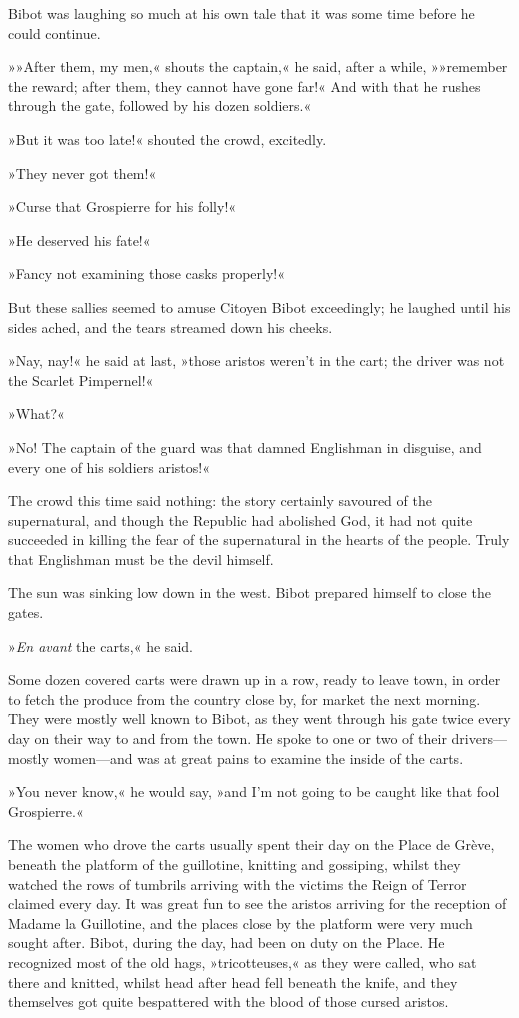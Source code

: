 Bibot was laughing so much at his own tale that it was some time before he could continue.

»»After them, my men,« shouts the captain,« he said, after a while, »»remember the reward; after them, they cannot have gone far!« And with that he rushes through the gate, followed by his dozen soldiers.«

»But it was too late!« shouted the crowd, excitedly.

»They never got them!«

»Curse that Grospierre for his folly!«

»He deserved his fate!«

»Fancy not examining those casks properly!«

But these sallies seemed to amuse Citoyen Bibot exceedingly; he laughed until his sides ached, and the tears streamed down his cheeks.

»Nay, nay!« he said at last, »those aristos weren't in the cart; the driver was not the Scarlet Pimpernel!«

»What?«

»No! The captain of the guard was that damned Englishman in disguise, and every one of his soldiers aristos!«

The crowd this time said nothing: the story certainly savoured of the supernatural, and though the Republic had abolished God, it had not quite succeeded in killing the fear of the supernatural in the hearts of the people. Truly that Englishman must be the devil himself.

The sun was sinking low down in the west. Bibot prepared himself to close the gates.

»\textit{En avant} the carts,« he said.

Some dozen covered carts were drawn up in a row, ready to leave town, in order to fetch the produce from the country close by, for market the next morning. They were mostly well known to Bibot, as they went through his gate twice every day on their way to and from the town. He spoke to one or two of their drivers\allowbreak---\allowbreak mostly women\allowbreak---\allowbreak and was at great pains to examine the inside of the carts.

»You never know,« he would say, »and I'm not going to be caught like that fool Grospierre.«

The women who drove the carts usually spent their day on the Place de Grève, beneath the platform of the guillotine, knitting and gossiping, whilst they watched the rows of tumbrils arriving with the victims the Reign of Terror claimed every day. It was great fun to see the aristos arriving for the reception of Madame la Guillotine, and the places close by the platform were very much sought after. Bibot, during the day, had been on duty on the Place. He recognized most of the old hags, »tricotteuses,« as they were called, who sat there and knitted, whilst head after head fell beneath the knife, and they themselves got quite bespattered with the blood of those cursed aristos.

